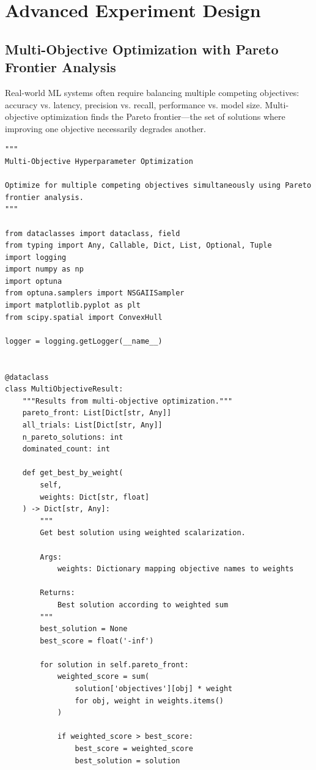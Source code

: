 \section{Advanced Experiment Design}

\subsection{Multi-Objective Optimization with Pareto Frontier Analysis}

Real-world ML systems often require balancing multiple competing objectives: accuracy vs. latency, precision vs. recall, performance vs. model size. Multi-objective optimization finds the Pareto frontier---the set of solutions where improving one objective necessarily degrades another.

\begin{lstlisting}[style=python, caption={Multi-objective optimization with Pareto frontier}]
"""
Multi-Objective Hyperparameter Optimization

Optimize for multiple competing objectives simultaneously using Pareto frontier analysis.
"""

from dataclasses import dataclass, field
from typing import Any, Callable, Dict, List, Optional, Tuple
import logging
import numpy as np
import optuna
from optuna.samplers import NSGAIISampler
import matplotlib.pyplot as plt
from scipy.spatial import ConvexHull

logger = logging.getLogger(__name__)


@dataclass
class MultiObjectiveResult:
    """Results from multi-objective optimization."""
    pareto_front: List[Dict[str, Any]]
    all_trials: List[Dict[str, Any]]
    n_pareto_solutions: int
    dominated_count: int

    def get_best_by_weight(
        self,
        weights: Dict[str, float]
    ) -> Dict[str, Any]:
        """
        Get best solution using weighted scalarization.

        Args:
            weights: Dictionary mapping objective names to weights

        Returns:
            Best solution according to weighted sum
        """
        best_solution = None
        best_score = float('-inf')

        for solution in self.pareto_front:
            weighted_score = sum(
                solution['objectives'][obj] * weight
                for obj, weight in weights.items()
            )

            if weighted_score > best_score:
                best_score = weighted_score
                best_solution = solution


\end{lstlisting}
